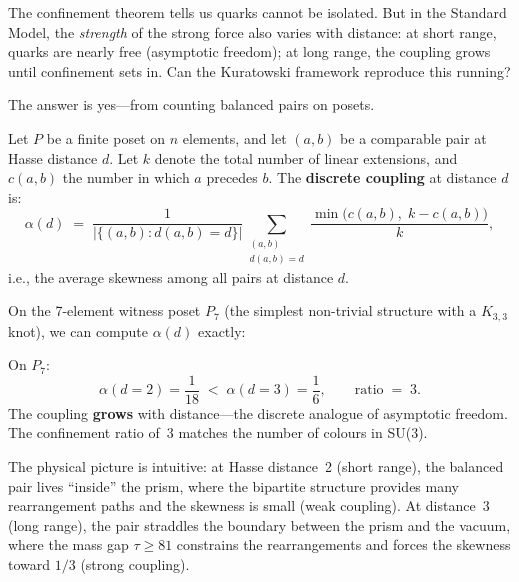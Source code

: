\documentclass[11pt, a4paper, openany]{book}
\newcounter{thm}[chapter]
\begin{document}
\noindent
The confinement theorem tells us quarks cannot be isolated.  But in the
Standard Model, the \emph{strength} of the strong force also varies with
distance: at short range, quarks are nearly free (asymptotic freedom);
at long range, the coupling grows until confinement sets in.  Can the
Kuratowski framework reproduce this running?

The answer is yes---from counting balanced pairs on posets.

\begin{definition}\label{def:discrete-coupling}
Let $P$ be a finite poset on $n$ elements, and let $(a,b)$ be a
comparable pair at Hasse distance $d$.  Let $k$ denote the total number
of linear extensions, and $c(a,b)$ the number in which $a$ precedes $b$.
The \textbf{discrete coupling} at distance $d$ is:
\[
  \alpha(d) \;=\; \frac{1}{|\{(a,b) : d(a,b)=d\}|}
  \sum_{\substack{(a,b)\\d(a,b)=d}}
  \frac{\min\!\bigl(c(a,b),\; k - c(a,b)\bigr)}{k},
\]
i.e., the average skewness among all pairs at distance $d$.
\end{definition}

\noindent
On the 7-element witness poset $P_7$ (the simplest non-trivial
structure with a $K_{3,3}$ knot), we can compute $\alpha(d)$ exactly:

\begin{theorem}\label{thm:asymptotic-freedom}
On $P_7$:
\[
  \alpha(d{=}2) = \frac{1}{18} \;<\; \alpha(d{=}3) = \frac{1}{6},
  \qquad
  \text{ratio} \;=\; 3.
\]
The coupling \textbf{grows} with distance---the discrete analogue of
asymptotic freedom.  The confinement ratio of~$3$ matches the number of
colours in SU(3).
\end{theorem}

\noindent
The physical picture is intuitive: at Hasse distance~2 (short range),
the balanced pair lives ``inside'' the prism, where the bipartite
structure provides many rearrangement paths and the skewness is small
(weak coupling).  At distance~3 (long range), the pair straddles the
boundary between the prism and the vacuum, where the mass gap
$\tau \geq 81$ constrains the rearrangements and forces the skewness
toward $1/3$ (strong coupling).
\end{document}
